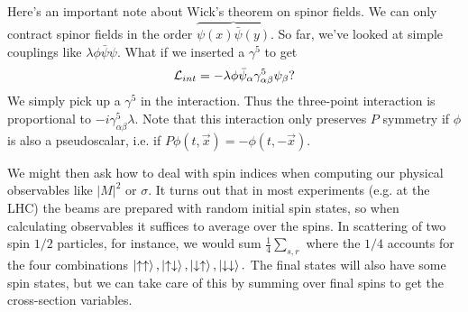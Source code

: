 Here's an important note about Wick's theorem on spinor fields. We can only contract spinor fields in the order $\overbrace{\psi(x)\bar \psi(y)}$. So far, we've looked at simple couplings like $\lambda \phi \bar \psi \psi$. What if we inserted a $\gamma^5$ to get
$$\mathcal L_{int}=-\lambda \phi \bar \psi_\alpha \gamma^5_{\alpha\beta} \psi_\beta?$$ We simply pick up a $\gamma^5$ in the interaction. Thus the three-point interaction is proportional to $-i\gamma^5_{\alpha\beta}\lambda.$
Note that this interaction only preserves $P$ symmetry if $\phi$ is also a pseudoscalar, i.e. if $P\phi(t,\vec x)=-\phi(t,-\vec x).$

We might then ask how to deal with spin indices when computing our physical observables like $|M|^2$ or $\sigma$. It turns out that in most experiments (e.g. at the LHC) the beams are prepared with random initial spin states, so when calculating observables it suffices to average over the spins. In scattering of two spin $1/2$ particles, for instance, we would sum $\frac{1}{4}\sum_{s,r}$ where the $1/4$ accounts for the four combinations $\left| \uparrow\uparrow \right>,\left| \uparrow\downarrow \right>,\left| \downarrow\uparrow \right>,\left| \downarrow\downarrow \right>.$ The final states will also have some spin states, but we can take care of this by summing over final spins to get the cross-section variables.

